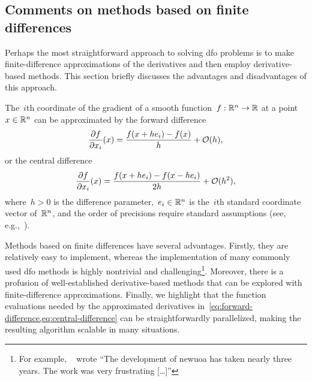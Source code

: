 \subsection{Comments on methods based on finite differences}
\label{subsec:finite-difference}

Perhaps the most straightforward approach to solving \gls{dfo} problems is to make finite-difference approximations of the derivatives and then employ derivative-based methods.
This section  briefly discusses the advantages and disadvantages of this approach.

The~$i$th coordinate of the gradient of a smooth function~$f : \mathbb{R}^n \to \mathbb{R}$ at a point~$x \in \mathbb{R}^n$ can be approximated by the forward difference
\begin{equation}
    \label{eq:forward-difference}
    \frac{\partial f}{\partial x_i}(x) = \frac{f(x + h e_i) - f(x)}{h} + \operatorname{\mathcal{O}}(h),
\end{equation}
or the central difference
\begin{equation}
    \label{eq:central-difference}
    \frac{\partial f}{\partial x_i}(x) = \frac{f(x + h e_i) - f(x - h e_i)}{2h} + \operatorname{\mathcal{O}}(h^2),
\end{equation}
where~$h > 0$ is the difference parameter,~$e_i \in \mathbb{R}^n$ is the~$i$th standard coordinate vector of~$\mathbb{R}^n$, and the order of precisions require standard assumptions (see, e.g.,~\cite[\S~8.1]{Nocedal_Wright_2006}).

Methods based on finite differences have several advantages.
Firstly, they are relatively easy to implement, whereas the implementation of many commonly used \gls{dfo} methods is highly nontrivial and challenging\footnote{For example, \citeauthor{Powell_2006}~\cite{Powell_2006} wrote \enquote{The development of \gls{newuoa} has taken nearly three years. The work was very frustrating [\dots]}}.
Moreover, there is a profusion of well-established derivative-based methods that can be explored with finite-difference approximations.
Finally, we highlight that the function evaluations needed by the approximated derivatives in~\cref{eq:forward-difference,eq:central-difference} can be straightforwardly parallelized, making the resulting algorithm scalable in many situations.

